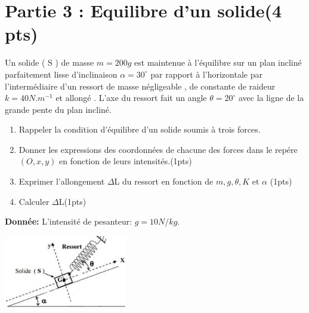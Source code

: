 \documentclass[12pt]{article}
\begin{document}
\section*{Partie 3 : Equilibre d'un solide\dotfill(4 pts)}
Un solide ( S ) de masse $m = 200 g$ est maintenue à l’équilibre sur un plan incliné parfaitement lisse
d’inclinaison $\alpha = 30^{\circ}$ par rapport à l’horizontale par l’intermédiaire d’un ressort de masse négligeable , de
constante de raideur $k = 40 N.m^{-1}$ et allongé . L’axe du
ressort fait un angle $\theta= 20^{\circ}$ avec la ligne de la grande
pente du plan incliné.

\begin{enumerate}
  
	\item  Rappeler la condition d’équilibre d’un solide soumis à trois forces.
 \item Donner les expressions des coordonnées de chacune des forces dans le repére $(O, x, y)$ en fonction de leurs intensités.\dotfill(1pts)
 \item Exprimer l’allongement $\Delta$L du ressort en fonction de $m, g, \theta, K$ et $\alpha$ \dotfill(1pts)
 \item Calculer $\Delta$L\dotfill(1pts)
\end{enumerate}

\textbf{Donnée: }  L'intensité de pesanteur: $g = 10N/kg$.
 \begin{center}
	 \includegraphics[width=0.4\textwidth]{./img/img02.png}
\end{center}
\end{document}
